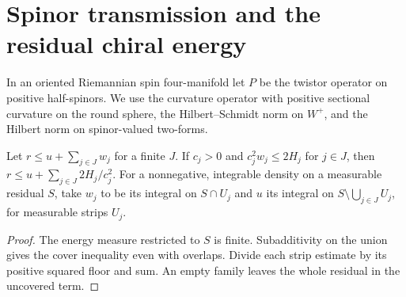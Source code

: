 \section{Spinor transmission and the residual chiral energy}

In an oriented Riemannian spin four-manifold let $P$ be the twistor
operator on positive half-spinors. We use the curvature operator with
positive sectional curvature on the round sphere, the Hilbert--Schmidt
norm on $W^+$, and the Hilbert norm on spinor-valued two-forms.

\begin{lemma}
\label{lem:finite-cover-defect-bound}
\leanok
Let $r\le u+\sum_{j\in J} w_j$ for a finite $J$. If $c_j>0$ and
$c_j^2 w_j\le 2H_j$ for $j\in J$, then
$r\le u+\sum_{j\in J}2H_j/c_j^2$.
For a nonnegative, integrable density on a measurable residual $S$,
take $w_j$ to be its integral on $S\cap U_j$ and $u$ its integral on
$S\setminus\bigcup_{j\in J}U_j$, for measurable strips $U_j$.
\end{lemma}
\begin{proof}
\leanok
The energy measure restricted to $S$ is finite. Subadditivity on the
union gives the cover inequality even with overlaps. Divide each strip
estimate by its positive squared floor and sum. An empty family leaves
the whole residual in the uncovered term.
\end{proof}

